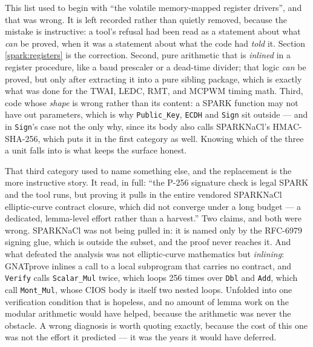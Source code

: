This list used to begin with ``the volatile memory-mapped register drivers'', and that
was wrong. It is left recorded rather than quietly removed, because the mistake is
instructive: a tool's refusal had been read as a statement about what \emph{can} be
proved, when it was a statement about what the code had \emph{told} it. Section
\ref{spark:registers} is the correction. Second, pure arithmetic that is \emph{inlined} in a register procedure, like a
baud prescaler or a dead-time divider; that logic \emph{can} be proved, but only after
extracting it into a pure sibling package, which is exactly what was done for the
TWAI, LEDC, RMT, and MCPWM timing math. Third, code whose \emph{shape} is wrong rather than its content: a SPARK function may not
have out parameters, which is why \lstinline{Public_Key}, \lstinline{ECDH} and
\lstinline{Sign} sit outside --- and in \lstinline{Sign}'s case not the only why, since its
body also calls SPARKNaCl's HMAC-SHA-256, which puts it in the first category as well.
Knowing which of the three a unit falls into is what keeps the surface honest.

That third category used to name something else, and the replacement is the more
instructive story. It read, in full: ``the P-256 signature check is legal SPARK and the
tool runs, but proving it pulls in the entire vendored SPARKNaCl elliptic-curve contract
closure, which did not converge under a long budget --- a dedicated, lemma-level effort
rather than a harvest.'' Two claims, and both were wrong. SPARKNaCl was not being pulled
in: it is named only by the RFC-6979 signing glue, which is outside the subset, and the
proof never reaches it. And what defeated the analysis was not elliptic-curve mathematics
but \emph{inlining}: GNATprove inlines a call to a local subprogram that carries no
contract, and \lstinline{Verify} calls \lstinline{Scalar_Mul} twice, which loops 256 times
over \lstinline{Dbl} and \lstinline{Add}, which call \lstinline{Mont_Mul}, whose CIOS body
is itself two nested loops. Unfolded into one verification condition that is hopeless, and
no amount of lemma work on the modular arithmetic would have helped, because the
arithmetic was never the obstacle. A wrong diagnosis is worth quoting exactly, because the
cost of this one was not the effort it predicted --- it was the years it would have
deferred.

